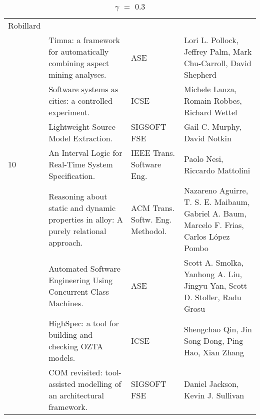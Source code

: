 \begin{table}[ht]
{\begin{tabular}{|llll|}
Robillard \\
\rowcolor{black!20} & Timna: a framework for automatically combining aspect mining analyses.& ASE& 
Lori L. Pollock, Jeffrey Palm, Mark Chu-Carroll, David Shepherd \\
 & Software systems as cities: a controlled experiment.& ICSE& Michele Lanza, Romain Robbes, Richard 
Wettel \\
\rowcolor{black!20} & Lightweight Source Model Extraction.& SIGSOFT FSE& Gail C. Murphy, David 
Notkin \\
10 & An Interval Logic for Real-Time System Specification.& IEEE Trans. Software Eng.& Paolo Nesi, 
Riccardo Mattolini \\
\rowcolor{black!20} & Reasoning about static and dynamic properties in alloy: A purely relational 
approach.& ACM Trans. Softw. Eng. Methodol.& Nazareno Aguirre, T. S. E. Maibaum, Gabriel A. Baum, 
Marcelo F. Frias, Carlos López Pombo \\
 & Automated Software Engineering Using Concurrent Class Machines.& ASE& Scott A. Smolka, Yanhong A. 
Liu, Jingyu Yan, Scott D. Stoller, Radu Grosu \\
\rowcolor{black!20} & HighSpec: a tool for building and checking OZTA models.& ICSE& Shengchao Qin, 
Jin Song Dong, Ping Hao, Xian Zhang \\
 & COM revisited: tool-assisted modelling of an architectural framework.& SIGSOFT FSE& Daniel 
Jackson, Kevin J. Sullivan \\
    \hline
    \end{tabular}
  }
    \caption {$\gamma$ $=$ $0.3$}
\end{table}